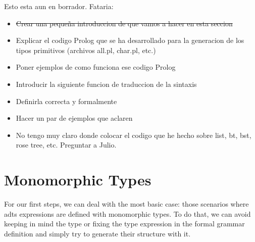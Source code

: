 \documentclass{report}
\theoremstyle{definition}
\theoremstyle{definition}
\begin{document}
Esto esta aun en borrador. Fataria:
\begin{itemize}
	\item \sout{Crear una pequeña introduccion de que vamos a hacer en esta seccion}
	\item Explicar el codigo Prolog que se ha desarrollado para la generacion de los tipos primitivos (archivos all.pl, char.pl, etc.)
	\item Poner ejemplos de como funciona ese codigo Prolog
	\item Introducir la siguiente funcion de traduccion de la sintaxis
	\item Definirla correcta y formalmente
	\item Hacer un par de ejemplos que aclaren
	\item No tengo muy claro donde colocar el codigo que he hecho sobre list, bt, bst, rose tree, etc. Preguntar a Julio.
\end{itemize}
\pagebreak

\section{Monomorphic Types}

For our first steps, we can deal with the most basic case: those scenarios where adts expressions are defined with monomorphic types. To do that, we can avoid keeping in mind the type or fixing the type expression in the formal grammar definition and simply try to generate their structure with it.\\
\end{document}
